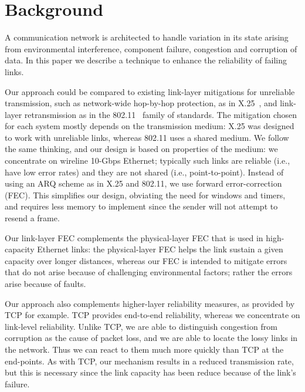 \section{Background}
A communication network is architected to handle variation in its state
arising from environmental interference, component failure, congestion and
corruption of data. In this paper we describe a technique to enhance the
reliability of failing links.

Our approach could be compared to existing link-layer mitigations for
unreliable transmission, such as network-wide hop-by-hop protection, as in
X.25~\cite{X25}, and link-layer retransmission as in the 802.11~\cite{WiFi} family of
standards. The mitigation chosen for each system mostly depends on
the transmission medium: X.25 was designed to work with unreliable links,
whereas 802.11 uses a shared medium. We follow the same thinking,
and our design is based on properties of the medium: we concentrate on wireline
10-Gbps Ethernet; typically such links are reliable (i.e., have low error
rates) and they are not shared (i.e., point-to-point).
Instead of using an ARQ scheme as in X.25 and 802.11, we use forward
error-correction (FEC). This simplifies our design, obviating the need for
windows and timers, and requires less memory to implement since the sender
will not attempt to resend a frame.

Our link-layer FEC complements the physical-layer FEC that is used in
high-capacity Ethernet links: the physical-layer FEC helps the link sustain a
given capacity over longer distances, whereas our FEC is intended to mitigate
errors that do not arise because of challenging environmental factors; rather
the errors arise because of faults.

Our approach also complements higher-layer reliability measures, as provided by
TCP for example.  TCP provides end-to-end reliability, whereas we concentrate
on link-level reliability. Unlike TCP, we are able to distinguish congestion
from corruption as the cause of packet loss, and we are able to locate the
lossy links in the network. Thus we can react to them much more quickly than
TCP at the end-points. As with TCP, our mechanism results in a reduced
transmission rate, but this is necessary since the link capacity has been
reduce because of the link's failure.

